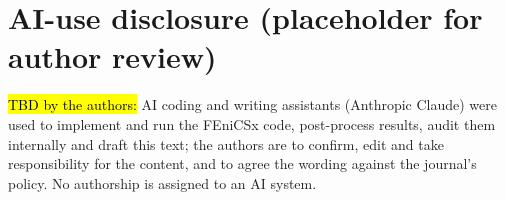 \documentclass[sn-mathphys,Numbered]{sn-jnl}
\begin{document}
\section*{AI-use disclosure (placeholder for author review)}
\hl{TBD by the authors:} AI coding and writing assistants (Anthropic Claude) were used to implement and run the FEniCSx code, post-process results, audit them internally and draft this text; the authors are to confirm, edit and take responsibility for the content, and to agree the wording against the journal's policy. No authorship is assigned to an AI system.


\end{document}
